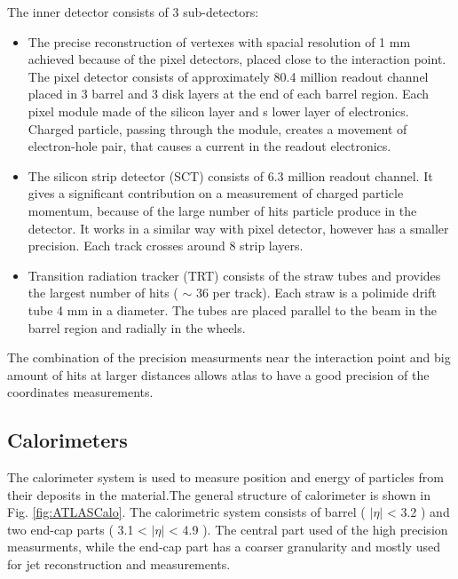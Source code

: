 The inner detector consists of 3 sub-detectors:
\begin{itemize}
\item The precise reconstruction of vertexes with spacial resolution of 1 mm achieved because of the pixel detectors, placed close to the interaction point. The pixel detector consists of approximately 80.4 million readout channel placed in 3 barrel and 3 disk layers at the end of each barrel region.  Each pixel module made of the silicon layer and s lower layer of electronics. Charged particle, passing through the module, creates a movement of electron-hole pair, that causes a current in the readout electronics.
\item The silicon strip detector (SCT) consists of 6.3 million readout channel. It gives a significant contribution on a measurement of charged particle momentum, because of the large number of hits particle produce in the detector. It works in a similar way with pixel detector, however has a smaller precision. Each track crosses around 8 strip layers. 
\item Transition radiation tracker (TRT) consists of the straw tubes and provides the largest number of hits ( $\sim$ 36 per track). Each straw is a polimide drift tube 4 mm in a diameter. The tubes are placed parallel to the beam in the barrel region and radially in the wheels.
\end{itemize}

The combination of the precision measurments near the interaction point and big amount of hits at larger distances allows atlas to have a good precision of the coordinates measurements.

\subsection{Calorimeters}\label{sec:forwardCalo}
\begin{figure}[!tb]
\end{figure}

The calorimeter system is used to measure position and energy of particles from their deposits in the material.The general structure of \atlas calorimeter is shown in Fig. \ref{fig:ATLASCalo}. The calorimetric system consists of barrel ( 	$|\eta|$ < 3.2 ) and two end-cap parts ( 3.1 < $|\eta|$  < 4.9 ). The central part used of the high precision measurments, while the end-cap part has a coarser granularity and mostly used for jet reconstruction and \etmiss measurements. 


